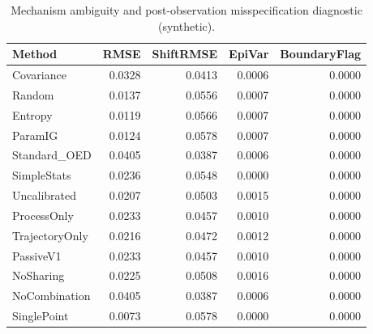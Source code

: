 \begin{table}[t]
\caption{Mechanism ambiguity and post-observation misspecification diagnostic (synthetic).}
\label{tab:experiment1}
\begin{tabular}{lrrrr}
\toprule
Method & RMSE & ShiftRMSE & EpiVar & BoundaryFlag \\
\midrule
Covariance & 0.0328 & 0.0413 & 0.0006 & 0.0000 \\
Random & 0.0137 & 0.0556 & 0.0007 & 0.0000 \\
Entropy & 0.0119 & 0.0566 & 0.0007 & 0.0000 \\
ParamIG & 0.0124 & 0.0578 & 0.0007 & 0.0000 \\
Standard\_OED & 0.0405 & 0.0387 & 0.0006 & 0.0000 \\
SimpleStats & 0.0236 & 0.0548 & 0.0000 & 0.0000 \\
Uncalibrated & 0.0207 & 0.0503 & 0.0015 & 0.0000 \\
ProcessOnly & 0.0233 & 0.0457 & 0.0010 & 0.0000 \\
TrajectoryOnly & 0.0216 & 0.0472 & 0.0012 & 0.0000 \\
PassiveV1 & 0.0233 & 0.0457 & 0.0010 & 0.0000 \\
NoSharing & 0.0225 & 0.0508 & 0.0016 & 0.0000 \\
NoCombination & 0.0405 & 0.0387 & 0.0006 & 0.0000 \\
SinglePoint & 0.0073 & 0.0578 & 0.0000 & 0.0000 \\
\bottomrule
\end{tabular}
\end{table}
